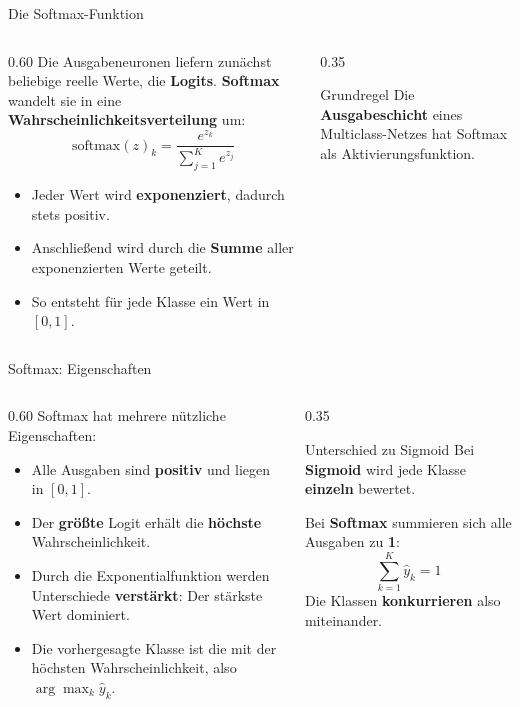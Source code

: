 \begin{frame}{Die Softmax-Funktion}
\begin{columns}
\begin{column}{0.60\textwidth}
Die Ausgabeneuronen liefern zunächst beliebige reelle Werte, die \textbf{Logits}. \textbf{Softmax} wandelt sie in eine \textbf{Wahrscheinlichkeitsverteilung} um:
\[
\text{softmax}(z)_k = \frac{e^{z_k}}{\sum_{j=1}^{K} e^{z_j}}
\]
\begin{itemize}
\item Jeder Wert wird \textbf{exponenziert}, dadurch stets positiv.
\item Anschließend wird durch die \textbf{Summe} aller exponenzierten Werte geteilt.
\item So entsteht für jede Klasse ein Wert in $[0,1]$.
\end{itemize}
\end{column}
\begin{column}{0.35\textwidth}
\begin{blockC2}{Grundregel}
  Die \textbf{Ausgabeschicht} eines Multiclass-Netzes hat Softmax als Aktivierungsfunktion.
\end{blockC2}
\end{column}
\end{columns}
\end{frame}

\begin{frame}{Softmax: Eigenschaften}
\begin{columns}
\begin{column}{0.60\textwidth}
Softmax hat mehrere nützliche Eigenschaften:
\begin{itemize}
\item Alle Ausgaben sind \textbf{positiv} und liegen in $[0,1]$.
\item Der \textbf{größte} Logit erhält die \textbf{höchste} Wahrscheinlichkeit.
\item Durch die Exponentialfunktion werden Unterschiede \textbf{verstärkt}: Der stärkste Wert dominiert.
\item Die vorhergesagte Klasse ist die mit der höchsten Wahrscheinlichkeit, also $\arg\max_k \hat{y}_k$.
\end{itemize}
\end{column}
\begin{column}{0.35\textwidth}
\begin{block}{Unterschied zu Sigmoid}
Bei \textbf{Sigmoid} wird jede Klasse \textbf{einzeln} bewertet.

\vspace{0.3em}
Bei \textbf{Softmax} summieren sich alle Ausgaben zu \textbf{1}:
\[
\sum_{k=1}^{K} \hat{y}_k = 1
\]
Die Klassen \textbf{konkurrieren} also miteinander.
\end{block}
\end{column}
\end{columns}
\end{frame}

